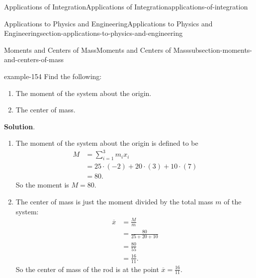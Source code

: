 \documentclass[oneside,10pt,]{book}
\numberwithin{equation}{section}
\newcommand{\amp}{&}
\begin{document}
\begin{chapterptx}{Applications of Integration}{}{Applications of Integration}{}{}{applications-of-integration}
\begin{sectionptx}{Applications to Physics and Engineering}{}{Applications to Physics and Engineering}{}{}{section-applications-to-physics-and-engineering}
\begin{subsectionptx}{Moments and Centers of Mass}{}{Moments and Centers of Mass}{}{}{subsection-moments-and-centers-of-mass}
\begin{example}{}{example-154}
Find the following:\leavevmode%
\begin{enumerate}
\item\hypertarget{li-55}{}\hypertarget{p-694}{}%
The moment of the system about the origin.%
\item\hypertarget{li-56}{}\hypertarget{p-695}{}%
The center of mass.%
\end{enumerate}
%
\par\smallskip%
\noindent\textbf{Solution}.\hypertarget{solution-150}{}\quad%
\leavevmode%
\begin{enumerate}
\item\hypertarget{li-57}{}\hypertarget{p-696}{}%
The moment of the system about the origin is defined to be%
\begin{align*}
M \amp= \sum_{i=1}^{3}m_{i}x_{i}\\
\amp= 25\cdot(-2)+20\cdot(3)+10\cdot(7)\\
\amp= 80.
\end{align*}
So the moment is \(M = 80\).%
\item\hypertarget{li-58}{}\hypertarget{p-697}{}%
The center of mass is just the moment divided by the total mass \(m\) of the system:%
\begin{align*}
\overline{x}\amp= \frac{M}{m}\\
\amp= \frac{80}{25+20+10}\\
\amp= \frac{80}{55}\\
\amp= \frac{16}{11}.
\end{align*}
So the center of mass of the rod is at the point \(\overline{x} = \frac{16}{11}\).%
\end{enumerate}
\end{example}
\begin{figure}
\centering
{
}
\end{figure}
\end{subsectionptx}
\end{sectionptx}
\end{chapterptx}
\end{document}
